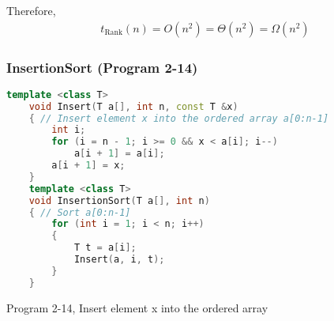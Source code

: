 \documentclass{article}
\begin{document}
Therefore,
\begin{align}
    \boxed{t_{\text{Rank}}(n) = O(n^2) = \Theta(n^2) = \Omega(n^2)}
\end{align}

\subsubsection{InsertionSort (Program 2-14)}

\begin{lstlisting}[language=C++]
    template <class T>
    void Insert(T a[], int n, const T &x)
    { // Insert element x into the ordered array a[0:n-1]
        int i;
        for (i = n - 1; i >= 0 && x < a[i]; i--)
            a[i + 1] = a[i];
        a[i + 1] = x;
    }
    template <class T>
    void InsertionSort(T a[], int n)
    { // Sort a[0:n-1]
        for (int i = 1; i < n; i++)
        {
            T t = a[i];
            Insert(a, i, t);
        }
    }
\end{lstlisting}
\begin{center}
    Program 2-14, Insert element x into the ordered array
\end{center}
\end{document}
